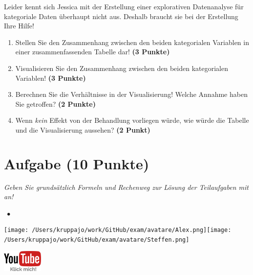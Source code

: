 \documentclass[a4paper, 9pt]{scrartcl}\usepackage[]{graphicx}\usepackage[]{xcolor}
\begin{document}
\vspace{2Ex}

Leider kennt sich Jessica mit der Erstellung einer explorativen Datenanalyse für kategoriale Daten überhaupt nicht aus. Deshalb braucht sie bei der Erstellung Ihre Hilfe!

\begin{enumerate}
\item Stellen Sie den Zusammenhang zwischen den beiden kategorialen Variablen in einer zusammenfassenden Tabelle dar! \textbf{(3 Punkte)}
\item Visualisieren Sie den Zusammenhang zwischen den beiden kategorialen Variablen! \textbf{(3 Punkte)}
\item Berechnen Sie die Verhältnisse in der Visualisierung! Welche Annahme haben Sie getroffen? \textbf{(2 Punkte)}
\item Wenn \textit{kein} Effekt von der Behandlung vorliegen würde, wie würde die Tabelle und die Visualisierung aussehen? \textbf{(2 Punkt)}
\end{enumerate} 
\clearpage

\section{Aufgabe \hfill (10 Punkte)}

\textit{Geben Sie grundsätzlich Formeln und Rechenweg zur Lösung der Teilaufgaben mit an!} \\[1Ex]
 

 
\ifcollection
\begin{flushright}
\tiny\vspace{-3Ex}
\textbf{\examinhaltstart}
\exammodulestatversuch $\;\bullet$
\exammodulebiostat
\vspace{-4Ex}
\end{flushright}
\begin{minipage}[t]{0.5\textwidth}
\texttt{[image: /Users/kruppajo/work/GitHub/exam/avatare/Alex.png]}\hspace{-4mm}\texttt{[image: /Users/kruppajo/work/GitHub/exam/avatare/Steffen.png]}
\end{minipage}
\begin{minipage}[t]{0.5\textwidth}
\hfill
\href{https://youtu.be/Op-gjzASH9I}{\includegraphics[width = 2cm]{img/youtube}}
\end{minipage}
\fi
\end{document}
